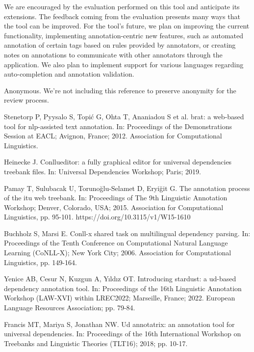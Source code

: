 \documentclass{elektr}
\begin{document}
We are encouraged by the evaluation performed on this tool and anticipate its extensions.
The feedback coming from the evaluation presents many ways that the tool can be improved.
For the tool's future, we plan on improving the current functionality, implementing annotation-centric new features, such as automated annotation of certain tags based on rules provided by annotators, or creating notes on annotations to communicate with other annotators through the application.
We also plan to implement support for various languages regarding auto-completion and annotation validation.

% 
\begin{thebibliography}{99}

 Anonymous. We're not including this reference to preserve anonymity for the review process.

 Stenetorp P, Pyysalo S, Topi\'{c} G, Ohta T, Ananiadou S et al. brat: a web-based tool for nlp-assisted text annotation. In: Proceedings of the Demonstrations Session at EACL; Avignon, France; 2012. Association for Computational Linguistics.

 Heinecke J. Conllueditor: a fully graphical editor for universal dependencies treebank files. In: Universal Dependencies Workshop; Paris; 2019.

 Pamay T, Sulubacak U, Toruno{\u{g}}lu-Selamet D, Eryi{\u{g}}it G. The annotation process of the itu web treebank. In: Proceedings of The 9th Linguistic Annotation Workshop; Denver, Colorado, USA; 2015. Association for Computational Linguistics, pp. 95-101. https://doi.org/10.3115/v1/W15-1610

 Buchholz S, Marsi E. Conll-x shared task on multilingual dependency parsing. In: Proceedings of the Tenth Conference on Computational Natural Language Learning (CoNLL-X); New York City; 2006. Association for Computational Linguistics, pp. 149-164.

 Yenice AB, Cesur N, Kuzgun A, Y{\i}ld{\i}z OT. Introducing stardust: a ud-based dependency annotation tool. In: Proceedings of the 16th Linguistic Annotation Workshop (LAW-XVI) within LREC2022; Marseille, France; 2022. European Language Resources Association; pp. 79-84.

 Francis MT, Mariya S, Jonathan NW. Ud annotatrix: an annotation tool for universal dependencies. In: Proceedings of the 16th International Workshop on Treebanks and Linguistic Theories (TLT16); 2018; pp. 10-17.


\end{thebibliography}
\end{document}

